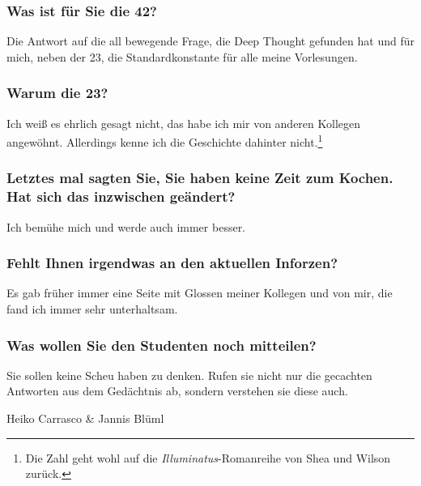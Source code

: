 {    \subsubsection{Was ist für Sie die 42?}
    Die Antwort auf die all bewegende Frage, die Deep Thought gefunden hat und für mich, neben der 23, die Standardkonstante für alle meine Vorlesungen.

    \subsubsection{Warum die 23?}
    Ich weiß es ehrlich gesagt nicht, das habe ich mir von anderen Kollegen angewöhnt. Allerdings kenne ich die Geschichte dahinter nicht.\footnote{Die Zahl geht wohl auf die {\em Illuminatus}-Romanreihe von Shea und Wilson zurück.}

    \subsubsection{Letztes mal sagten Sie, Sie haben keine Zeit zum Kochen. Hat sich das inzwischen geändert?}
    Ich bemühe mich und werde auch immer besser.

    \subsubsection{Fehlt Ihnen irgendwas an den aktuellen Inforzen?}
    Es gab früher immer eine Seite mit Glossen meiner Kollegen und von mir, die fand ich immer sehr unterhaltsam.

    \subsubsection{Was wollen Sie den Studenten noch mitteilen?}
    Sie sollen keine Scheu haben zu denken. Rufen sie nicht nur die gecachten Antworten aus dem Gedächtnis ab, sondern verstehen sie diese auch.

}
{Heiko Carrasco \& Jannis Blüml}

\vfill
\begin{minipage}{0.5\textwidth}
\end{minipage}
\begin{minipage}{0.5\textwidth}
\end{minipage}

\newpage
